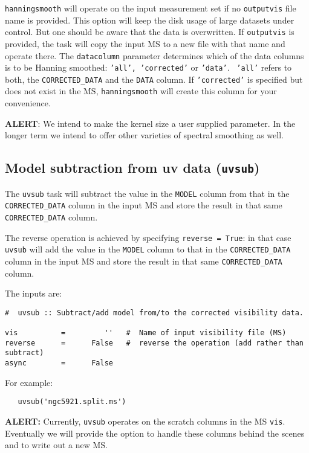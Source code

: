 {\tt hanningsmooth} will operate on the input measurement set if no
{\tt outputvis} file name is provided. This option will keep the disk
usage of large datasets under control. But one should be aware that
the data is overwritten. If {\tt outputvis} is provided, the task will
copy the input MS to a new file with that name and operate there. The
{\tt datacolumn} parameter determines which of the data columns is to
be Hanning smoothed: {\tt 'all', 'corrected'} or {\tt 'data'}. {\tt
  'all'} refers to both, the {\tt CORRECTED\_DATA} and the {\tt DATA}
column. If {\tt 'corrected'} is specified but does not exist in the
MS, {\tt hanningsmooth} will create this column for your convenience.

{\bf ALERT}: We intend to make the kernel size a user supplied
parameter.  In the longer term we intend to offer other varieties of
spectral smoothing as well.

\subsection{Model subtraction from uv data ({\tt uvsub})}
\label{section:cal.other.uvsub}

The {\tt uvsub} task will subtract the value in the {\tt MODEL} column
from that in the {\tt CORRECTED\_DATA} column in the input MS and
store the result in that same {\tt CORRECTED\_DATA} column.

The reverse operation is achieved by specifying {\tt reverse = True}:
in that case {\tt uvsub} will add the value in the {\tt MODEL} column
to that in the {\tt CORRECTED\_DATA} column in the input MS and store
the result in that same {\tt CORRECTED\_DATA} column.

The inputs are:

\small
\begin{verbatim}
#  uvsub :: Subtract/add model from/to the corrected visibility data.

vis          =         ''   #  Name of input visibility file (MS)
reverse      =      False   #  reverse the operation (add rather than subtract)
async        =      False   
\end{verbatim}
\normalsize

For example:
\small
\begin{verbatim}
   uvsub('ngc5921.split.ms')
\end{verbatim}
\normalsize

{\bf ALERT:} Currently, {\tt uvsub} operates on the scratch
columns in the MS {\tt vis}.  Eventually we will provide the option to
handle these columns behind the scenes and to write out a new MS.

